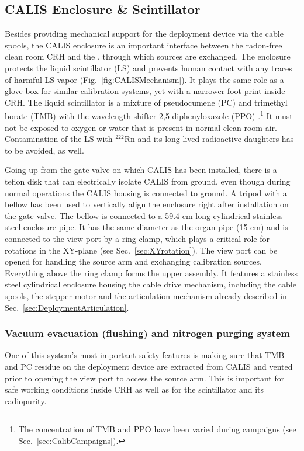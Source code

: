
\subsection{CALIS Enclosure \& Scintillator}

Besides providing mechanical support for the deployment device via the cable spools, the CALIS enclosure is an important interface between the radon-free clean room CRH and the \lsv, through which sources are exchanged. 
The enclosure protects the liquid scintillator (LS) and prevents human contact with any traces of harmful LS vapor (Fig.~\ref{fig:CALISMechanism}). It plays the same role as a glove box for similar calibration systems, yet with a narrower foot print inside CRH. The liquid scintillator is a mixture of pseudocumene (PC) and trimethyl borate (TMB) with the wavelength shifter 2,5-diphenyloxazole (PPO) \cite{Agnes:2015qyz}.\footnote{The concentration of TMB and PPO have been varied during campaigns (see Sec.~\ref{sec:CalibCampaigns}).} %
It must not be exposed to oxygen or water that is present in normal clean room air. Contamination of the LS with $^{222}$Rn and its long-lived radioactive daughters has to be avoided, as well. 

Going up from the gate valve on which CALIS has been installed, there is a teflon disk that can electrically isolate CALIS from ground, even though during normal operations the CALIS housing is connected to ground. A tripod with a bellow has been used to vertically align the enclosure right after installation on the gate valve. The bellow is connected to a 59.4 cm long cylindrical stainless steel enclosure pipe. It has the same diameter as the organ pipe (15 cm) and is connected to the view port by a ring clamp, which plays a critical role for rotations in the XY-plane (see Sec.~\ref{sec:XYrotation}). The view port can be opened for handling the source arm and exchanging calibration sources. Everything above the ring clamp forms the upper assembly. It features a stainless steel cylindrical enclosure housing the cable drive mechanism, including the cable spools, the stepper motor and the articulation mechanism already described in Sec.~\ref{sec:DeploymentArticulation}. 

\subsubsection*{Vacuum evacuation (flushing) and nitrogen purging system}\label{sec:EvacPurge}
One of this system's most important safety features is making sure that TMB and PC residue on the deployment device are extracted from CALIS and vented prior to opening the view port to access the source arm. This is important for safe working conditions inside CRH as well as for the scintillator and its radiopurity. 

